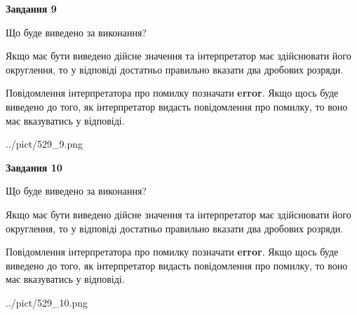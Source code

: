 \documentclass[12pt, ukrainian]{article}
\begin{document}
{\begin {Large}
{\begin {center}\textbf{Завдання 9}\end {center}}\par
Що буде виведено за виконання? \par

Якщо має бути виведено дійсне значення та інтерпретатор має здійснювати його округлення, 
то у відповіді достатньо правильно вказати два дробових розряди.

Повідомлення інтерпретатора про помилку позначати \textbf{error}.
Якщо щось буде виведено до того, як інтерпретатор видасть повідомлення про помилку, 
то воно має вказуватись у відповіді. \par

\begin{center}
	{../pict/529_9.png}
\end{center}
\newpage

{\begin {center}\textbf{Завдання 10}\end {center}}\par
Що буде виведено за виконання? \par

Якщо має бути виведено дійсне значення та інтерпретатор має здійснювати його округлення, 
то у відповіді достатньо правильно вказати два дробових розряди.

Повідомлення інтерпретатора про помилку позначати \textbf{error}.
Якщо щось буде виведено до того, як інтерпретатор видасть повідомлення про помилку, 
то воно має вказуватись у відповіді. \par

\begin{center}
	{../pict/529_10.png}
\end{center}
\newpage

\end {Large}}
\end{document}
